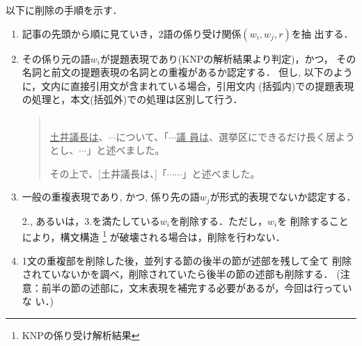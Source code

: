 以下に削除の手順を示す．
\begin{enumerate}
\item 記事の先頭から順に見ていき，2語の係り受け関係$(w_{i},w_{j},r)$を抽
      出する．

\item  その係り元の語$w_{i}$が提題表現であり(KNPの解析結果より判定)，かつ，
その名詞と前文の提題表現の名詞との重複があるか認定する．
      但し, 以下のように，文内に直接引用文が含まれている場合，引用文内
      (括弧内)での提題表現の処理と，本文(括弧外)での処理は区別して行う．
\vspace{5mm}     \begin{quote}\label{rei:rei15}
      \hspace*{-1em}{\bf 例14：}\\
      \underline{土井議長は}、$\cdots$について、「$\cdots$\underline{議
      員は}、選挙区にできるだけ長く居ようとし、$\cdots$」と述べました。

      その上で、[土井議長は、]「$\cdots\cdots$」と述べました。
     \end{quote}\vspace{5mm}
      
\item   一般の重複表現であり, かつ, 係り先の語$w_{j}$が形式的表現でないか認定する．
      
2., あるいは，3.を満たしている$w_{i}$を削除する．ただし，$w_{i}$を
削除することにより，構文構造
      \footnote{KNPの係り受け解析結果}
      が破壊される場合は，削除を行わない．

\item  1文の重複部を削除した後，並列する節の後半の節が述部を残して全て
      削除されていないかを調べ，削除されていたら後半の節の述部も削除する．
(注意：前半の節の述部に，文末表現を補完する必要があるが，今回は行っていな
      い．)
\end{enumerate}

\vspace{1.5ex}

